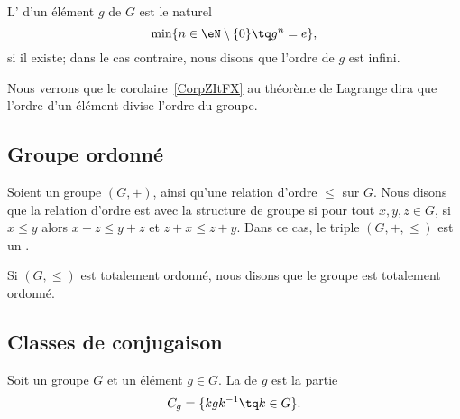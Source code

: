 \begin{definition}      \label{DEFooKSTVooOObpgC}
	L' d'un élément \( g\) de \( G\) est le naturel
	\begin{equation}
		\min\{ n\in\eN\setminus\{ 0 \}\tq g^n=e \},
	\end{equation}
	si il existe; dans le cas contraire, nous disons que l'ordre de \( g\) est infini.
\end{definition}

\begin{normaltext}
	Nous verrons que le corolaire~\ref{CorpZItFX} au théorème de Lagrange dira que l'ordre d'un élément divise l'ordre du groupe.
\end{normaltext}


\subsection{Groupe ordonné}

\begin{definition}        \label{DEFooEUHFooYvhnLQ}
	Soient un groupe \( (G,+)\), ainsi qu'une relation d'ordre \( \leq\) sur \( G\). Nous disons que la relation d'ordre est  avec la structure de groupe si pour tout \( x,y,z\in G\), si \( x\leq y\) alors \( x+z\leq y+z\) et \( z+x\leq z+y\). Dans ce cas, le triple \( (G,+,\leq)\) est un .

	Si \( (G,\leq)\) est totalement ordonné, nous disons que le groupe est totalement ordonné.
\end{definition}

\subsection{Classes de conjugaison}

\begin{definition}       \label{DEFooOLXPooWelsZV}
	Soit un groupe \( G\) et un élément \( g\in G\). La  de \( g\) est la partie
	\begin{equation}
		C_g=\{ kgk^{-1}\tq k\in G \}.
	\end{equation}
\end{definition}

